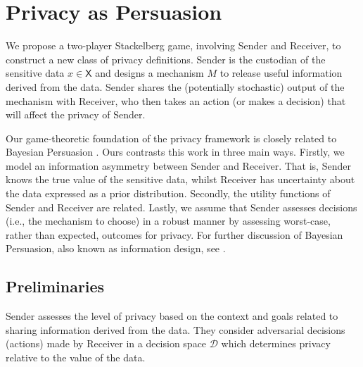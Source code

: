 \documentclass{article}
\theoremstyle{plain}
\theoremstyle{plain}
\theoremstyle{definition}
\theoremstyle{remark}
\theoremstyle{plain}
\newcommand{\xtrue}{x}
\newcommand{\xset}{\mathsf{X}}
\newcommand{\dset}{\mathcal{D}}
\begin{document}
\section{Privacy as Persuasion}
We propose a two-player Stackelberg game, involving Sender and Receiver, to construct a new class of privacy definitions. Sender is the custodian of the sensitive data $\xtrue \in \xset$ and designs a mechanism $M$ to release useful information derived from the data. Sender shares the (potentially stochastic) output of the mechanism with Receiver, who then takes an action (or makes a decision) that will affect the privacy of Sender.

Our game-theoretic foundation of the privacy framework is closely related to Bayesian Persuasion \citep{kamenica2011bayesian}. Ours contrasts this work in three main ways. Firstly, we model an information asymmetry between Sender and Receiver. That is, Sender knows the true value of the sensitive data, whilst Receiver has uncertainty about the data expressed as a prior distribution. Secondly, the utility functions of Sender and Receiver are related. Lastly, we assume that Sender assesses decisions (i.e., the mechanism to choose) in a robust manner by assessing worst-case, rather than expected, outcomes for privacy.  For further discussion of Bayesian Persuasion, also known as information design, see \citet{kamenica2019bayesian}.

\subsection{Preliminaries}

Sender assesses the level of privacy based on the context and goals related to sharing information derived from the data. They consider adversarial decisions (actions) made by Receiver in a decision space $\dset$ which determines privacy relative to the value of the data.
\end{document}

